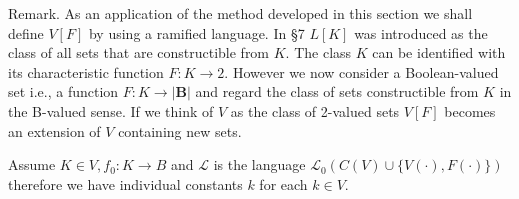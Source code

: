 Remark. As an application of the method developed in this section we shall define $V[F]$ by using a ramified language. In §7 $L[K]$ was introduced as the class of all sets that are constructible from $K$. The class $K$ can be identified with its characteristic function $F: K \rightarrow 2$. However we now consider a Boolean-valued set i.e., a function $F: K \rightarrow |\mathbf{B}|$ and regard the class of sets constructible from $K$ in the B-valued sense. If we think of $V$ as the class of 2-valued sets $V[F]$ becomes an extension of $V$ containing new sets.

Assume $K \in V, f_0: K \rightarrow B$ and $\mathcal{L}$ is the language $\mathcal{L}_0(C(V) \cup \{V(\cdot), F(\cdot)\})$ therefore we have individual constants $k$ for each $k \in V$.
